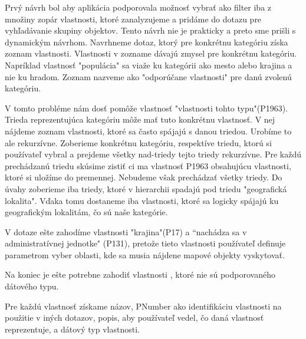 Prvý návrh bol aby aplikácia podporovala možnosť vybrať ako filter iba z množiny zopár vlastnosti, ktoré zanalyzujeme a pridáme do dotazu pre vyhľadávanie skupiny objektov.
Tento návrh nie je prakticky a preto sme prišli s dynamickým návrhom.
Navrhneme dotaz, ktorý pre konkrétnu kategóriu získa zoznam vlastnosti. Vlastnosti v zozname dávajú zmysel pre konkrétnu kategóriu.
Napríklad vlastnosť "populácia" sa viaže ku kategórii ako mesto alebo krajina a nie ku hradom. Zoznam nazveme ako "odporúčane vlastnosti" pre danú zvolenú kategóriu.

V tomto probléme nám dosť pomôže vlastnosť "vlastnosti tohto typu"(P1963).
Trieda reprezentujúca kategóriu môže mať tuto konkrétnu vlastnosť. V nej nájdeme zoznam vlastnosti, ktoré sa často spájajú s danou triedou.
Urobíme to ale rekurzívne. Zoberieme konkrétnu kategóriu, respektíve triedu, ktorú si používateľ vybral a prejdeme všetky nad-triedy tejto triedy rekurzívne.
Pre každú prechádzanú triedu skúsime zistiť ci ma vlastnosť P1963 obsahujúcu vlastnosti, ktoré si uložíme do premennej. Nebudeme však prechádzať všetky triedy.
Do úvahy zoberieme iba triedy, ktoré v hierarchii spadajú pod triedu "geografická lokalita". Vďaka tomu dostaneme iba vlastnosti, ktoré sa logicky spájajú ku
geografickým lokalitám, čo sú naše kategórie.

V dotaze ešte zahodíme vlastnosti "krajina"(P17) a “nachádza sa v administratívnej jednotke" (P131), pretože tieto vlastnosti používateľ definuje parametrom vyber oblasti, kde
sa musia nájdene mapové objekty vyskytovať.

Na koniec je ešte potrebne zahodiť vlastnosti , ktoré nie sú podporovaného dátového typu.

Pre každú vlastnosť získame názov, PNumber ako identifikáciu vlastnosti na použitie v iných dotazov,
popis, aby používateľ vedel, čo daná vlastnosť reprezentuje, a dátový typ vlastnosti.

